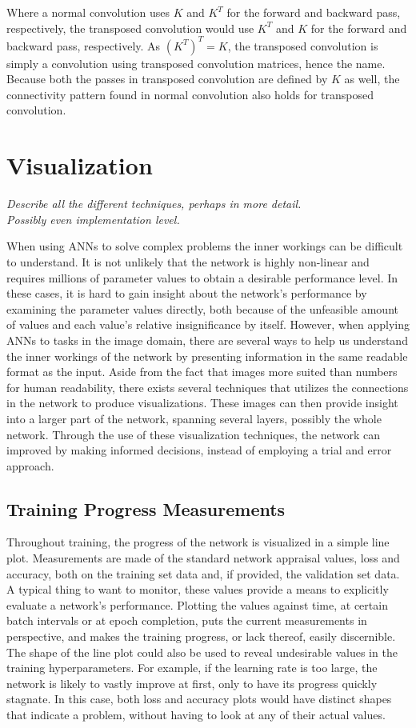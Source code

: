 \noindent Where a normal convolution uses $K$ and $K^T$ for the forward and backward pass, respectively, the transposed convolution would use $K^T$ and $K$ for the forward and backward pass, respectively. As $(K^T)^T=K$, the transposed convolution is simply a convolution using transposed convolution matrices, hence the name. Because both the passes in transposed convolution are defined by $K$ as well, the connectivity pattern found in normal convolution also holds for transposed convolution. \\

\section{Visualization}
\textit{Describe all the different techniques, perhaps in more detail. \\
Possibly even implementation level.}

When using ANNs to solve complex problems the inner workings can be difficult to understand. It is not unlikely that the network is highly non-linear and requires millions of parameter values to obtain a desirable performance level. In these cases, it is hard to gain insight about the network's performance by examining the parameter values directly, both because of the unfeasible amount of values and each value's relative insignificance by itself. However, when applying ANNs to tasks in the image domain, there are several ways to help us understand the inner workings of the network by presenting information in the same readable format as the input. Aside from the fact that images more suited than numbers for human readability, there exists several techniques that utilizes the connections in the network to produce visualizations. These images can then provide insight into a larger part of the network, spanning several layers, possibly the whole network. Through the use of these visualization techniques, the network can improved by making informed decisions, instead of employing a trial and error approach. 

\subsection{Training Progress Measurements}

Throughout training, the progress of the network is visualized in a simple line plot. Measurements are made of the standard network appraisal values, loss and accuracy, both on the training set data and, if provided, the validation set data. A typical thing to want to monitor, these values provide a means to explicitly evaluate a network's performance. Plotting the values against time, at certain batch intervals or at epoch completion, puts the current measurements in perspective, and makes the training progress, or lack thereof, easily discernible. The shape of the line plot could also be used to reveal undesirable values in the training hyperparameters. For example, if the learning rate is too large, the network is likely to vastly improve at first, only to have its progress quickly stagnate. In this case, both loss and accuracy plots would have distinct shapes that indicate a problem, without having to look at any of their actual values.

